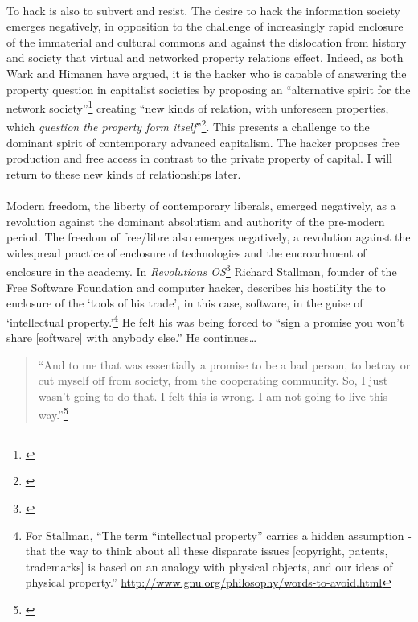 \paragraph{}To hack is also to subvert and resist. The desire to hack the information society emerges negatively, in opposition to the challenge of increasingly rapid enclosure of the immaterial and cultural commons and against the dislocation from history and society that virtual and networked property relations effect. Indeed, as both Wark and Himanen have argued, it is the hacker who is capable of answering the property question in capitalist societies by proposing an ``alternative spirit for the network society''\footnote{\cite[p. 12]{himanen:2001he}} creating ``new kinds of relation, with unforeseen properties, which \textit{question the property form itself}''\footnote{\cite[036, emphasis added.]{wark:2004hm}}. This presents a challenge to the dominant spirit of contemporary advanced capitalism. The hacker proposes free production and free access in contrast to the private property of capital. I will return to these new kinds of relationships later.

\paragraph{}Modern freedom, the liberty of contemporary liberals, emerged negatively, as a revolution against the dominant absolutism and authority of the pre-modern period. The freedom of free/libre also emerges negatively, a revolution against the widespread practice of enclosure of technologies and the encroachment of enclosure in the academy. In \textit{Revolutions OS}\footnote{\cite{moore:2002rv}} Richard Stallman, founder of the Free Software Foundation and computer hacker, describes his hostility the to enclosure of the `tools of his trade', in this case, software, in the guise of `intellectual property.'\footnote{For Stallman, ``The term “intellectual property” carries a hidden assumption - that the way to think about all these disparate issues [copyright, patents, trademarks] is based on an analogy with physical objects, and our ideas of physical property.'' \url{http://www.gnu.org/philosophy/words-to-avoid.html}} He felt his was being forced to ``sign a promise you won't share [software] with anybody else.'' He continues\ldots

\begin{quote}``And to me that was essentially a promise to be a bad person, to betray or cut myself off from society, from the cooperating community. So, I just wasn't going to do that. I felt this is wrong. I am not going to live this way.''\footnote{\cite[9m55sec]{moore:2002rv}}
\end{quote}

